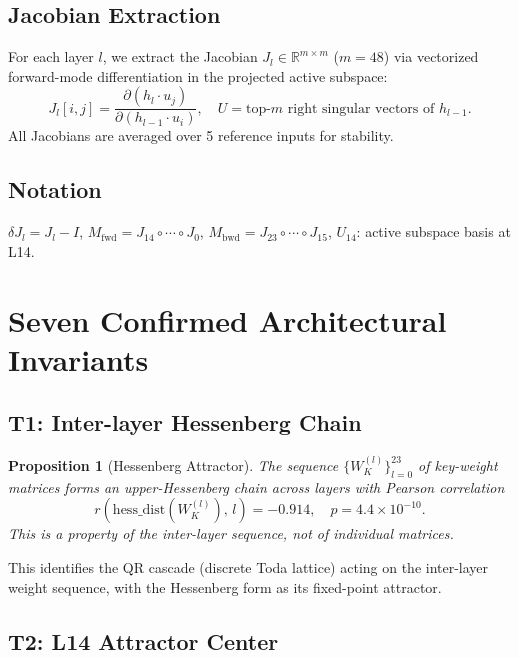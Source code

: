 \documentclass[11pt,a4paper]{article}
\newtheorem{proposition}[theorem]{Proposition}
\begin{document}
\subsection{Jacobian Extraction}

For each layer $l$, we extract the Jacobian $J_l \in \mathbb{R}^{m \times m}$
($m{=}48$) via vectorized forward-mode differentiation in the projected
active subspace:
\[
J_l[i,j] = \frac{\partial (h_l \cdot u_j)}{\partial (h_{l-1} \cdot u_i)},
\quad U = \text{top-}m\text{ right singular vectors of } h_{l-1}.
\]
All Jacobians are averaged over 5 reference inputs for stability.

\subsection{Notation}

$\delta J_l = J_l - I$, \quad
$M_\text{fwd} = J_{14} \circ \cdots \circ J_0$, \quad
$M_\text{bwd} = J_{23} \circ \cdots \circ J_{15}$, \quad
$U_{14}$: active subspace basis at L14.

\section{Seven Confirmed Architectural Invariants}
\label{sec:invariants}

\subsection{T1: Inter-layer Hessenberg Chain}

\begin{proposition}[Hessenberg Attractor]
The sequence $\{W_K^{(l)}\}_{l=0}^{23}$ of key-weight matrices forms an
upper-Hessenberg chain across layers with Pearson correlation
\[
r\!\left(\text{hess\_dist}(W_K^{(l)}),\, l\right) = -0.914,\quad p = 4.4{\times}10^{-10}.
\]
This is a property of the inter-layer sequence, not of individual matrices.
\end{proposition}

This identifies the QR cascade (discrete Toda lattice) acting on the
inter-layer weight sequence, with the Hessenberg form as its fixed-point
attractor.

\subsection{T2: L14 Attractor Center}
\end{document}
